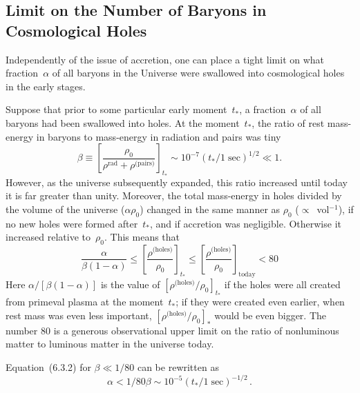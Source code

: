 
\subsection{Limit on the Number of Baryons in Cosmological Holes}
\label{sec:6.3}

Independently of the issue of accretion, one can place a tight limit on what
fraction~$\alpha$ of all baryons in the Universe were swallowed into cosmological holes
in the early stages.

Suppose that prior to some particular early moment~$t_*$, a fraction~$\alpha$ of all
baryons had been swallowed into holes.  At the moment~$t_*$, the ratio of rest mass-energy in baryons to mass-energy in radiation and pairs was tiny
%
\begin{equation}
\tag{6.3.1}
\beta \equiv \left[\frac{\rho_0}{\rho^{\text{rad}} + \rho^{\text{(pairs)}}}\right]_{t_*}
\sim 10^{-7} (t_*/1\;\text{sec})^{1/2} \ll 1.
\end{equation}
%
However, as the universe subsequently expanded, this ratio increased until today
it is far greater than unity.  Moreover, the total mass-energy in holes divided by
the volume of the universe ($\alpha \rho_0$) changed in the same manner as
$\rho_0$ ($\propto$~vol$^{-1}$), if no new holes were formed after~$t_*$, and if accretion was negligible.
Otherwise it increased relative to~$\rho_0$.  This means that
%
\begin{equation}
\tag{6.3.2}
\frac{\alpha}{\beta(1-\alpha)}
\leq \left[\frac{\rho^{\text{(holes)}}}{\rho_0}\right]_{t_*}
\leq \left[\frac{\rho^{\text{(holes)}}}{\rho_0}\right]_{\text{today}}
< 80
\end{equation}
%
Here $\alpha/[\beta(1-\alpha)]$ is the value of $[\rho^{\text{(holes)}}/\rho_0]_{t_*}$ if the holes were all created from
primeval plasma at the moment~$t_*$; if they were created even earlier, when rest
mass was even less important, $[\rho^{\text{(holes)}}/\rho_0]_*$ would be even bigger.  The number
80 is a generous observational upper limit on the ratio of nonluminous matter
to luminous matter in the universe today.

Equation~(6.3.2) for $\beta \ll 1/80$ can be rewritten as
%
\begin{equation}
\tag{6.3.3}
\alpha < 1/80\beta \sim 10^{-5} (t_*/1\;\text{sec})^{-1/2}\,.
\end{equation}

